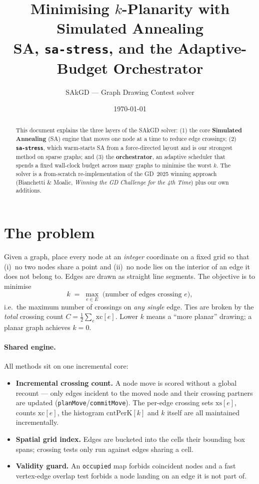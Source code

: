 \documentclass[11pt]{article}
\title{\vspace{-1.2cm}\textbf{Minimising $k$-Planarity with Simulated Annealing}\\[0.3em]
\large SA, \texttt{sa-stress}, and the Adaptive-Budget Orchestrator}
\author{SAkGD --- Graph Drawing Contest solver}
\date{\today}
\newcommand{\code}[1]{\colorbox{codebg}{\texttt{\small #1}}}
\begin{document}
\maketitle
\thispagestyle{fancy}

\begin{abstract}
\noindent This document explains the three layers of the SAkGD solver: (1) the core
\textbf{Simulated Annealing} (SA) engine that moves one node at a time to reduce edge
crossings; (2) \textbf{\texttt{sa-stress}}, which warm-starts SA from a force-directed
layout and is our strongest method on sparse graphs; and (3) the \textbf{orchestrator},
an adaptive scheduler that spends a fixed wall-clock budget across many graphs to
minimise the worst $k$. The solver is a from-scratch re-implementation of the GD~2025
winning approach (Bianchetti \& Moalic, \emph{Winning the GD Challenge for the 4th
Time}) plus our own additions.
\end{abstract}

\section{The problem}
Given a graph, place every node at an \emph{integer} coordinate on a fixed grid so that
(i)~no two nodes share a point and (ii)~no node lies on the interior of an edge it does
not belong to. Edges are drawn as straight line segments. The objective is to minimise
\[
  k \;=\; \max_{e \in E}\; \bigl(\text{number of edges crossing } e\bigr),
\]
i.e.\ the maximum number of crossings on \emph{any single} edge. Ties are broken by the
\emph{total} crossing count $C=\tfrac12\sum_e \mathrm{xc}[e]$. Lower $k$ means a
``more planar'' drawing; a planar graph achieves $k=0$.

\paragraph{Shared engine.} All methods sit on one incremental core:
\begin{itemize}[leftmargin=1.3em,itemsep=1pt]
  \item \textbf{Incremental crossing count.} A node move is scored without a global
  recount --- only edges incident to the moved node and their crossing partners are
  updated (\code{planMove}/\code{commitMove}). The per-edge crossing sets $\mathrm{xs}[e]$,
  counts $\mathrm{xc}[e]$, the histogram $\mathrm{cntPerK}[k]$ and $k$ itself are all
  maintained incrementally.
  \item \textbf{Spatial grid index.} Edges are bucketed into the cells their bounding
  box spans; crossing tests only run against edges sharing a cell.
  \item \textbf{Validity guard.} An \code{occupied} map forbids coincident nodes and a
  fast vertex-edge overlap test forbids a node landing on an edge it is not part of.
\end{itemize}
\end{document}
